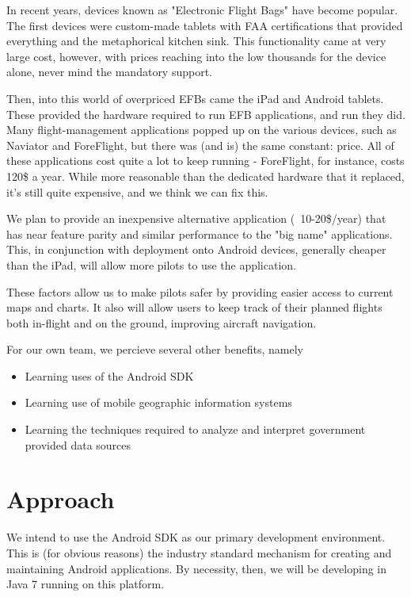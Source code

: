 \documentclass[10pt,a4paper]{report}
\begin{document}
In recent years, devices known as "Electronic Flight Bags" have become popular. The first devices were custom-made tablets with FAA certifications that provided everything and the metaphorical kitchen sink. This functionality came at very large cost, however, with prices reaching into the low thousands for the device alone, never mind the mandatory support.

Then, into this world of overpriced EFBs came the iPad and Android tablets. These provided the hardware required to run EFB applications, and run they did. Many flight-management applications popped up on the various devices, such as Naviator and ForeFlight, but there was (and is) the same constant: price. All of these applications cost quite a lot to keep running - ForeFlight, for instance, costs 120\$ a year. While more reasonable than the dedicated hardware that it replaced, it's still quite expensive, and we think we can fix this.

We plan to provide an inexpensive alternative application (~10-20\$/year) that has near feature parity and similar performance to the "big name" applications. This, in conjunction with deployment onto Android devices, generally cheaper than the iPad, will allow more pilots to use the application.

These factors allow us to make pilots safer by providing easier access to current maps and charts. It also will allow users to keep track of their planned flights both in-flight and on the ground, improving aircraft navigation.

For our own team, we percieve several other benefits, namely
\begin{itemize}
\item Learning uses of the Android SDK
\item Learning use of mobile geographic information systems
\item Learning the techniques required to analyze and interpret government provided data sources
\end{itemize}

\section{Approach}
We intend to use the Android SDK as our primary development environment. This is (for obvious reasons) the industry standard mechanism for creating and maintaining Android applications. By necessity, then, we will be developing in Java 7 running on this platform. 
\end{document}
